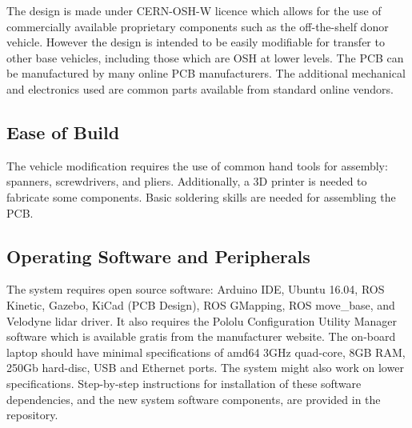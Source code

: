 \documentclass[a4paper]{article}
\begin{document}
	
	
	The design is made under CERN-OSH-W licence which allows for the use of commercially available proprietary components such as the off-the-shelf donor vehicle. However the design is intended to be easily modifiable for transfer to other base vehicles, including those which are OSH at lower levels. The PCB can be manufactured by many online PCB manufacturers. The additional mechanical and electronics used are common parts available from standard online vendors. 
	
	\subsection{Ease of Build}\label{h.wg823sgyb1e4}
	
	
	The vehicle modification requires the use of common hand tools for assembly: spanners, screwdrivers, and pliers. Additionally, a 3D printer is needed to fabricate some components. Basic soldering skills are needed for assembling the PCB. 
	
	\subsection{Operating Software and Peripherals}\label{h.uz77dixfh5i4}
	
	
	
	The system requires open source software: Arduino IDE, Ubuntu 16.04, ROS Kinetic, Gazebo, KiCad (PCB Design), ROS GMapping, ROS move\_base, and Velodyne lidar driver. It also requires the Pololu Configuration Utility Manager software which is available gratis from the manufacturer website. The on-board laptop should have minimal specifications of amd64 3GHz quad-core, 8GB RAM, 250Gb hard-disc, USB and Ethernet ports. The system might also work on lower specifications. Step-by-step instructions for installation of these software dependencies, and the new system software components, are provided in the repository.
	
\end{document}
